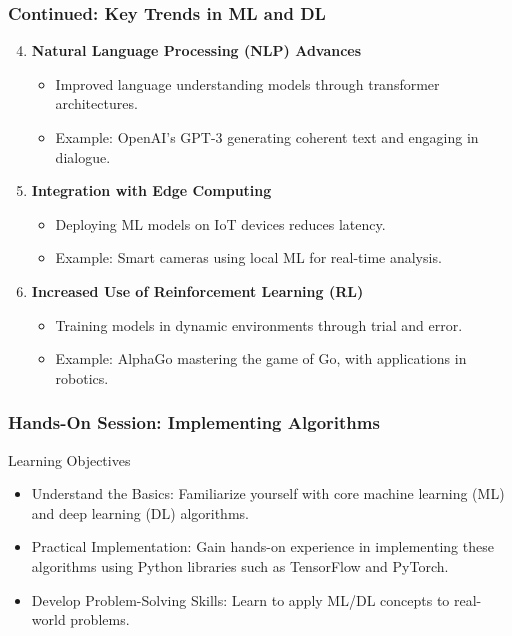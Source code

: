 \documentclass[aspectratio=169]{beamer}
\begin{document}
\begin{frame}[fragile]
    \frametitle{Continued: Key Trends in ML and DL}

    \begin{enumerate}
        \setcounter{enumi}{3}
        \item \textbf{Natural Language Processing (NLP) Advances}
            \begin{itemize}
                \item Improved language understanding models through transformer architectures.
                \item Example: OpenAI's GPT-3 generating coherent text and engaging in dialogue.
            \end{itemize}
        
        \item \textbf{Integration with Edge Computing}
            \begin{itemize}
                \item Deploying ML models on IoT devices reduces latency.
                \item Example: Smart cameras using local ML for real-time analysis.
            \end{itemize}
            
        \item \textbf{Increased Use of Reinforcement Learning (RL)}
            \begin{itemize}
                \item Training models in dynamic environments through trial and error.
                \item Example: AlphaGo mastering the game of Go, with applications in robotics.
            \end{itemize}
    \end{enumerate}
\end{frame}

\begin{frame}[fragile]
    \frametitle{Hands-On Session: Implementing Algorithms}
    \begin{block}{Learning Objectives}
        \begin{itemize}
            \item Understand the Basics: Familiarize yourself with core machine learning (ML) and deep learning (DL) algorithms.
            \item Practical Implementation: Gain hands-on experience in implementing these algorithms using Python libraries such as TensorFlow and PyTorch. 
            \item Develop Problem-Solving Skills: Learn to apply ML/DL concepts to real-world problems.
        \end{itemize}
    \end{block}
\end{frame}
\end{document}
